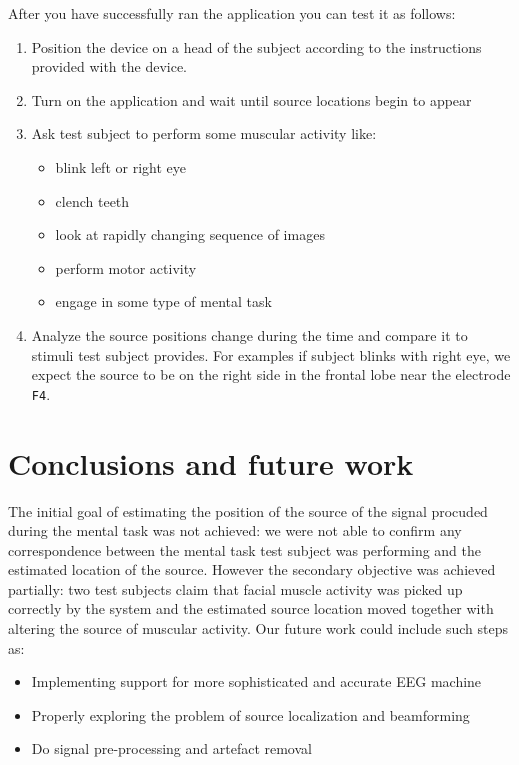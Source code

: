 \documentclass[twocolumn]{article}
\begin{document}
After you have successfully ran the application you can test it as follows:
\begin{enumerate}
	\item 	Position the device on a head of the subject according to the instructions provided with the device.
	\item Turn on the application and wait until source locations begin to appear
	\item Ask test subject to perform some muscular activity like:
		\begin{itemize}
			\item blink left or right eye
			\item clench teeth
			\item look at rapidly changing sequence of images
			\item perform motor activity
			\item engage in some type of mental task
		\end{itemize}
	\item Analyze the source positions change during the time and compare it to stimuli test subject provides. For examples if subject blinks with right eye, we expect the source to be on the right side in the frontal lobe near the electrode \texttt{F4}.
\end{enumerate}


%
%
\section*{Conclusions and future work}
The initial goal of estimating the position of the source of the signal procuded during the mental task was not achieved: we were not able to confirm any correspondence between the mental task test subject was performing and the estimated location of the source. However the secondary objective was achieved partially: two test subjects claim that facial muscle activity was picked up correctly by the system and the estimated source location moved together with altering the source of muscular activity. Our future work could include such steps as:
\begin{itemize}
	\item Implementing support for more sophisticated and accurate EEG machine
	\item Properly exploring the problem of source localization and beamforming
	\item Do signal pre-processing and artefact removal
\end{itemize}
%
%


 
\end{document}
